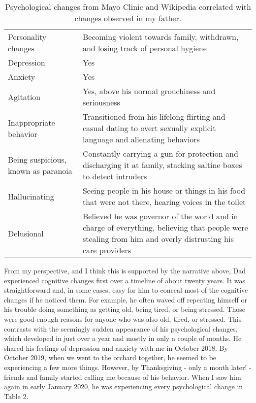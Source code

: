 \documentclass{article}
\begin{document}
\begin{table}[h!]
\centering
\begin{tabularx}{ 0.8\textwidth }{ | >{\raggedright\arraybackslash}X | >{\centering\arraybackslash}X | }
 \hline
 \multicolumn{2}{|c|}{Psychological Changes in Dad} \\
 \hline
 Personality changes & Becoming violent towards family, withdrawn, and losing track of personal hygiene \\
 \hline
 Depression & Yes \\
 \hline
 Anxiety & Yes  \\
 \hline
 Agitation & Yes, above his normal grouchiness and seriousness \\
 \hline
 Inappropriate behavior & Transitioned from his lifelong flirting and casual dating to overt sexually explicit language and alienating behaviors \\
 \hline
 Being suspicious, known as paranoia & Constantly carrying a gun for protection and discharging it at family, stacking saltine boxes to detect intruders \\
 \hline
 Hallucinating & Seeing people in his house or things in his food that were not there, hearing voices in the toilet \\
 \hline
 Delusional & Believed he was governor of the world and in charge of everything, believing that people were stealing from him and overly distrusting his care providers \\
 \hline
\end{tabularx}
\caption{Psychological changes from Mayo Clinic and Wikipedia correlated with changes observed in my father.}
\end{table}

From my perspective, and I think this is supported by the narrative above, Dad experienced cognitive changes first over a timeline of about twenty years. It was straightforward and, in some cases, easy for him to conceal most of the cognitive changes if he noticed them. For example, he often waved off repeating himself or his trouble doing something as getting old, being tired, or being stressed. Those were good enough reasons for anyone who was also old, tired, or stressed. This contrasts with the seemingly sudden appearance of his psychological changes, which developed in just over a year and mostly in only a couple of months. He shared his feelings of depression and anxiety with me in October 2018. By October 2019, when we went to the orchard together, he seemed to be experiencing a few more things. However, by Thanksgiving - only a month later! - friends and family started calling me because of his behavior. When I saw him again in early January 2020, he was experiencing every psychological change in Table 2. 
\end{document}

